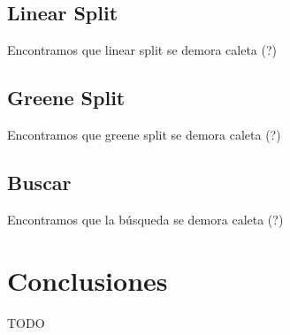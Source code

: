 \documentclass[letterpaper,10pt]{article}
\begin{document}
	\subsection{Linear Split}

	Encontramos que linear split se demora caleta (?)

	\subsection{Greene Split}

	Encontramos que greene split se demora caleta (?)

	\subsection{Buscar}

	Encontramos que la búsqueda se demora caleta (?)

	\newpage

	\section{Conclusiones}

	TODO
\end{document}
